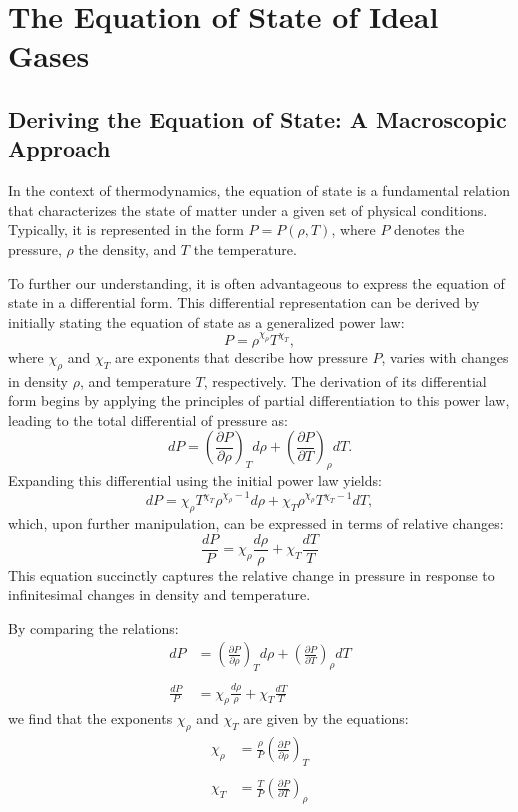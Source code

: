 \documentclass[main.tex]{subfiles}
\begin{document}
\chapter{The Equation of State of Ideal Gases}\label{apx:eos}
\section{Deriving the Equation of State: A Macroscopic Approach}
In the context of thermodynamics, the equation of state is a fundamental relation that characterizes the state of matter under a given set of physical conditions. Typically, it is represented in the form $P=P(\rho,T)$, where $P$ denotes the pressure, $\rho$ the density, and $T$ the temperature. 

To further our understanding, it is often advantageous to express the equation of state in a differential form. This differential representation can be derived by initially stating the equation of state as a generalized power law:
\begin{equation}
    P = \rho^{\chi_\rho} T^{\chi_T},
\end{equation}
where $\chi_\rho$ and $\chi_T$ are exponents that describe how pressure $P$, varies with changes in density $\rho$, and temperature $T$, respectively. The derivation of its differential form begins by applying the principles of partial differentiation to this power law, leading to the total differential of pressure as:
\begin{equation*}
    dP = \left( \frac{\partial P}{\partial \rho} \right)_T d\rho + \left( \frac{\partial P}{\partial T} \right)_\rho dT.
\end{equation*}
Expanding this differential using the initial power law yields:
\begin{equation*}
    dP = \chi_\rho T^{\chi_T} \rho^{\chi_\rho - 1} d\rho +  \chi_T \rho^{\chi_\rho} T^{\chi_T - 1} dT,
\end{equation*}
which, upon further manipulation, can be expressed in terms of relative changes:
\begin{equation}
    \frac{dP}{P} = \chi_\rho \frac{d\rho}{\rho} + \chi_T \frac{dT}{T}
\end{equation}
This equation succinctly captures the relative change in pressure in response to infinitesimal changes in density and temperature. 

By comparing the relations:
\begin{align*}
    \label{apx:eq:differential_form_of_eos}
    dP &= \left( \frac{\partial P}{\partial \rho} \right)_T d\rho + \left( \frac{\partial P}{\partial T} \right)_\rho dT \\\\
    \frac{dP}{P} &= \chi_\rho \frac{d\rho}{\rho} + \chi_T \frac{dT}{T}
\end{align*}
we find that the exponents $\chi_\rho$ and $\chi_T$ are given by the equations:
\begin{align*}
    \chi_\rho &= \frac{\rho}{P} \left( \frac{\partial P}{\partial \rho} \right)_T \\\\
    \chi_T &= \frac{T}{P} \left( \frac{\partial P}{\partial T} \right)_\rho
\end{align*}
\end{document}
